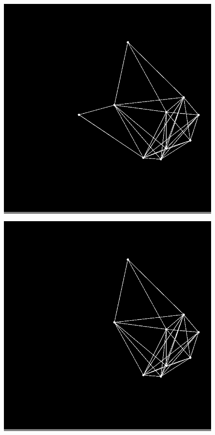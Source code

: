\documentclass{article}
\begin{document}
\begin{figure}
\begin{minipage}{0.2\textwidth}
            \end{minipage}
            \hspace{\fill}
            \begin{minipage}{0.2\textwidth}
            \colorbox{gray}{\includegraphics[width=\linewidth]{./images/slvo-10.png}}
            \end{minipage}
            \hspace{\fill}
            \begin{minipage}{0.2\textwidth}
            \colorbox{gray}{\includegraphics[width=\linewidth]{./images/slvo-11.png}}

\end{minipage}
\end{figure}
\end{document}
